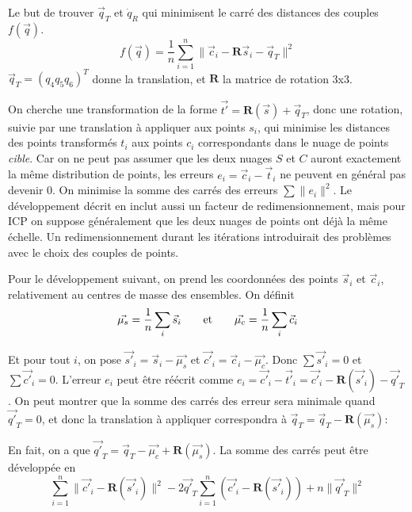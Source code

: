 \documentclass[a4paper,10pt]{scrreprt}
\begin{document}
Le but de trouver $\vec{q}_T$ et $\dot{q}_R$ qui minimisent le carré des distances des couples $f(\vec{q})$.
\begin{equation}
	f(\vec{q}) = \frac{1}{n} \sum_{i=1}^{n} \| \vec{c}_i - \mathbf{R} \vec{s}_i - \vec{q}_T \|^2
\end{equation}
$\vec{q}_T = (q_4 q_5 q_6)^T$ donne la translation, et $\mathbf{R}$ la matrice de rotation 3x3.

On cherche une transformation de la forme $\vec{t'} = \mathbf{R}(\vec{s}) + \vec{q}_T$, donc une rotation, suivie par une translation à appliquer aux points $s_i$, qui minimise les distances des points transformés $t_i$ aux points $c_i$ correspondants dans le nuage de points \emph{cible}. Car on ne peut pas assumer que les deux nuages $S$ et $C$ auront exactement la même distribution de points, les erreurs $e_i = \vec{c}_i - \vec{t}_i$ ne peuvent en général pas devenir $0$. On minimise la somme des carrés des erreurs $\sum \| e_i \|^2$. Le développement décrit en \cite{Horn1986} inclut aussi un facteur de redimensionnement, mais pour ICP on suppose généralement que les deux nuages de points ont déjà la même échelle. Un redimensionnement durant les itérations introduirait des problèmes avec le choix des couples de points.

Pour le développement suivant, on prend les coordonnées des points $\vec{s}_i$ et $\vec{c}_i$, relativement au centres de masse des ensembles. On définit
\begin{equation}
	\vec{\mu_s} = \frac{1}{n} \sum_{i} \vec{s}_i
	\hspace{7mm} \text{et} \hspace{7mm}
	\vec{\mu_c} = \frac{1}{n} \sum_{i} \vec{c}_i
\end{equation}

Et pour tout $i$, on pose $\vec{s'}_i = \vec{s}_i - \vec{\mu_s}$ et $\vec{c'}_i = \vec{c}_i - \vec{\mu_c}$. Donc $\sum \vec{s'}_i = 0$ et $\sum \vec{c'}_i = 0$. L'erreur $e_i$ peut être réécrit comme $e_i = \vec{c'}_i - \vec{t'}_i = \vec{c'}_i - \mathbf{R}(\vec{s'}_i) - \vec{q'}_T$. On peut montrer que la somme des carrés des erreur sera minimale quand $\vec{q'}_T = 0$, et donc la translation à appliquer correspondra à $\vec{q}_T = \vec{q}_T - \mathbf{R}(\vec{\mu_s})$:

En fait, on a que $\vec{q'}_T = \vec{q}_T - \vec{\mu_c} + \mathbf{R}(\vec{\mu_s})$. La somme des carrés peut être développée en
\begin{equation}
	\sum_{i=1}^{n} \| \vec{c'}_i - \mathbf{R}(\vec{s'}_i) \|^2 - 2 \vec{q'}_T \sum_{i=1}^{n} (\vec{c'}_i - \mathbf{R}(\vec{s'}_i)) + n \|\vec{q'}_T\|^2
\end{equation}
\end{document}
